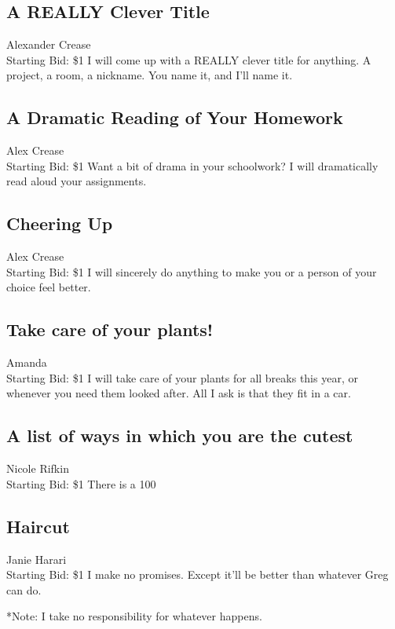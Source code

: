 \documentclass[11pt]{article}
\begin{document}
\subsection{A REALLY Clever Title}
Alexander Crease
\\
Starting Bid: \$1
\newline
I will come up with a REALLY clever title for anything. A project, a room, a nickname. You name it, and I'll name it.
\subsection{A Dramatic Reading of Your Homework}
Alex Crease
\\
Starting Bid: \$1
\newline
Want a bit of drama in your schoolwork? I will dramatically read aloud your assignments.
\subsection{Cheering Up}
Alex Crease
\\
Starting Bid: \$1
\newline
I will sincerely do anything to make you or a person of your choice feel better.
\subsection{Take care of your plants!}
Amanda
\\
Starting Bid: \$1
\newline
I will take care of your plants for all breaks this year, or whenever you need them looked after. All I ask is that they fit in a car.
\subsection{A list of ways in which you are the cutest}
Nicole Rifkin
\\
Starting Bid: \$1
\newline
There is a 100%
\subsection{Haircut}
Janie Harari
\\
Starting Bid: \$1
\newline
I make no promises.  Except it'll be better than whatever Greg can do.

*Note: I take no responsibility for whatever happens.
\end{document}

